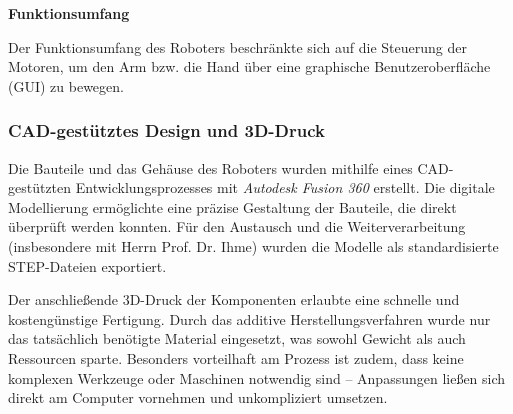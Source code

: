 

\textbf{Funktionsumfang}

Der Funktionsumfang des Roboters beschränkte sich auf die Steuerung der Motoren, um den Arm bzw. die Hand über eine graphische Benutzeroberfläche (GUI) zu bewegen.

\subsubsection{CAD-gestütztes Design und 3D-Druck}

Die Bauteile und das Gehäuse des Roboters wurden mithilfe eines CAD-gestützten Entwicklungsprozesses mit \textit{Autodesk Fusion 360} \cite{fusion360} erstellt. Die digitale Modellierung ermöglichte eine präzise Gestaltung der Bauteile, die direkt überprüft werden konnten. Für den Austausch und die Weiterverarbeitung (insbesondere mit Herrn Prof. Dr. Ihme) wurden die Modelle als standardisierte STEP-Dateien exportiert.

Der anschließende 3D-Druck der Komponenten erlaubte eine schnelle und kostengünstige Fertigung. Durch das additive Herstellungsverfahren wurde nur das tatsächlich benötigte Material eingesetzt, was sowohl Gewicht als auch Ressourcen sparte. Besonders vorteilhaft am Prozess ist zudem, dass keine komplexen Werkzeuge oder Maschinen notwendig sind – Anpassungen ließen sich direkt am Computer vornehmen und unkompliziert umsetzen.

